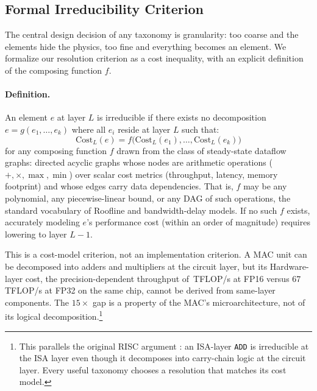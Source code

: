 \documentclass[10pt,twocolumn]{article}
\newcommand{\cvalint}[1]{\pgfmathprintnumber[fixed, precision=0, 1000 sep={\,}]{#1}}
\begin{document}
\subsection{Formal Irreducibility Criterion}
\label{sec:irreducibility}

The central design decision of any taxonomy is granularity: too coarse and the elements hide the physics, too fine and everything becomes an element. We formalize our resolution criterion as a cost inequality, with an explicit definition of the composing function $f$.

\paragraph{Definition.} An element $e$ at layer $L$ is irreducible if there exists no decomposition $e = g(e_1, \ldots, e_k)$ where all $e_i$ reside at layer $L$ such that:
\begin{equation}
\label{eq:irreducibility}
\text{Cost}_L(e) = f\bigl(\text{Cost}_L(e_1), \ldots, \text{Cost}_L(e_k)\bigr)
\end{equation}
for any composing function $f$ drawn from the class of steady-state dataflow graphs: directed acyclic graphs whose nodes are arithmetic operations ($+, \times, \max, \min$) over scalar cost metrics (throughput, latency, memory footprint) and whose edges carry data dependencies. That is, $f$ may be any polynomial, any piecewise-linear bound, or any DAG of such operations, the standard vocabulary of Roofline and bandwidth-delay models. If no such $f$ exists, accurately modeling $e$'s performance cost (within an order of magnitude) requires lowering to layer $L{-}1$.

This is a cost-model criterion, not an implementation criterion. A MAC unit can be decomposed into adders and multipliers at the circuit layer, but its Hardware-layer cost, the precision-dependent throughput of \cvalint{\HhPeakTFLOPS}\,TFLOP/s at FP16 versus 67\,TFLOP/s at FP32 on the same chip, cannot be derived from same-layer components. The $15\times$ gap is a property of the MAC's microarchitecture, not of its logical decomposition.\footnote{This parallels the original RISC argument \citep{patterson1980}: an ISA-layer \texttt{ADD} is irreducible at the ISA layer even though it decomposes into carry-chain logic at the circuit layer. Every useful taxonomy chooses a resolution that matches its cost model.}
\end{document}
